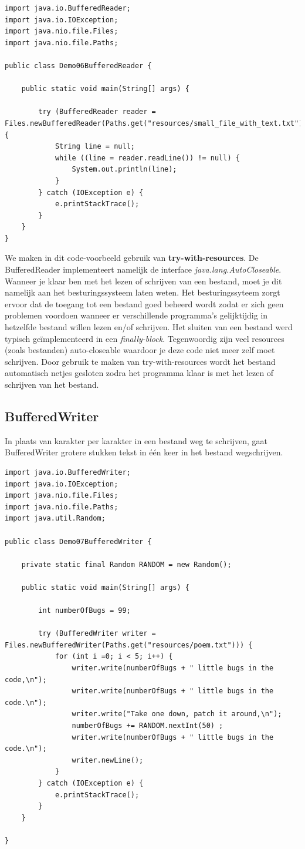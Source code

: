 \documentclass{tstextbook}
\begin{document}
\begin{lstlisting}
import java.io.BufferedReader;
import java.io.IOException;
import java.nio.file.Files;
import java.nio.file.Paths;

public class Demo06BufferedReader {

	public static void main(String[] args) {

		try (BufferedReader reader =  Files.newBufferedReader(Paths.get("resources/small_file_with_text.txt"))) {
			String line = null;
			while ((line = reader.readLine()) != null) {
				System.out.println(line);
			}
		} catch (IOException e) {
			e.printStackTrace();
		}
	}
}
\end{lstlisting}

We maken in dit code-voorbeeld gebruik van \textbf{try-with-resources}.
De BufferedReader implementeert namelijk de interface \textit{java.lang.AutoCloseable}. Wanneer je klaar ben met het lezen of schrijven van een bestand, moet je dit namelijk aan het besturingssysteem laten weten. Het besturingssyteem zorgt ervoor dat de toegang tot een bestand goed beheerd wordt zodat er zich geen problemen voordoen wanneer er verschillende programma's gelijktijdig in hetzelfde bestand willen lezen en/of schrijven. Het sluiten van een bestand werd typisch ge\"implementeerd in een \textit{finally-block}. Tegenwoordig zijn veel resources (zoals bestanden) auto-closeable waardoor je deze code niet meer zelf moet schrijven. Door gebruik te maken van try-with-resources wordt het bestand automatisch netjes gesloten zodra het programma klaar is met het lezen of schrijven van het bestand.

\subsection{BufferedWriter}

In plaats van karakter per karakter in een bestand weg te schrijven, gaat BufferedWriter grotere stukken tekst in \'e\'en keer in het bestand wegschrijven. 


\begin{lstlisting}
import java.io.BufferedWriter;
import java.io.IOException;
import java.nio.file.Files;
import java.nio.file.Paths;
import java.util.Random;

public class Demo07BufferedWriter {

	private static final Random RANDOM = new Random();

	public static void main(String[] args) {

		int numberOfBugs = 99;

		try (BufferedWriter writer =  Files.newBufferedWriter(Paths.get("resources/poem.txt"))) {
			for (int i =0; i < 5; i++) {
				writer.write(numberOfBugs + " little bugs in the code,\n");
				writer.write(numberOfBugs + " little bugs in the code.\n");
				writer.write("Take one down, patch it around,\n");
				numberOfBugs += RANDOM.nextInt(50) ;
				writer.write(numberOfBugs + " little bugs in the code.\n");
				writer.newLine();
			}
		} catch (IOException e) {
			e.printStackTrace();
		}
	}

}
\end{lstlisting}
\end{document}
